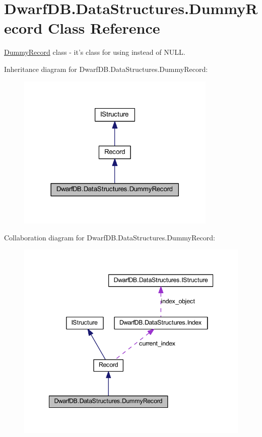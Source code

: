 \hypertarget{class_dwarf_d_b_1_1_data_structures_1_1_dummy_record}{
\section{DwarfDB.DataStructures.DummyRecord Class Reference}
\label{class_dwarf_d_b_1_1_data_structures_1_1_dummy_record}
}


\hyperlink{class_dwarf_d_b_1_1_data_structures_1_1_dummy_record}{DummyRecord} class -\/ it's class for using instead of NULL.  




Inheritance diagram for DwarfDB.DataStructures.DummyRecord:
\nopagebreak
\begin{figure}[H]
\begin{center}
\leavevmode
\includegraphics[width=270pt]{class_dwarf_d_b_1_1_data_structures_1_1_dummy_record__inherit__graph}
\end{center}
\end{figure}


Collaboration diagram for DwarfDB.DataStructures.DummyRecord:
\nopagebreak
\begin{figure}[H]
\begin{center}
\leavevmode
\includegraphics[width=342pt]{class_dwarf_d_b_1_1_data_structures_1_1_dummy_record__coll__graph}
\end{center}
\end{figure}
